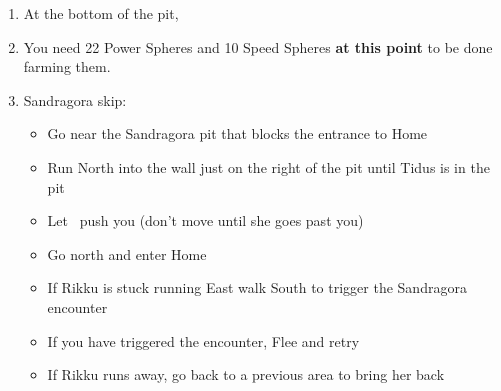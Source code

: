 \begin{enumerate}[resume]
    \item At the bottom of the pit, 
    \item You need 22 Power Spheres and 10 Speed Spheres \textbf{at this point} to be done farming them.
    \blitzballdetermination[true]{%
        \item \formation{\tidus}{\lulu}{\auron}
    }{%
        \item \formation{\tidus}{\rikku}{\auron}
    }
    \item Sandragora skip:
    \begin{itemize}
        \item Go near the Sandragora pit that blocks the entrance to Home
        \item Run North into the wall just on the right of the pit until Tidus is in the pit
        \item Let \rikku\ push you (don't move until she goes past you)
        \item Go north and enter Home
        \item If Rikku is stuck running East walk South to trigger the Sandragora encounter
        \item If you have triggered the encounter, Flee and retry
        \item If Rikku runs away, go back to a previous area to bring her back
    \end{itemize}
\end{enumerate}
\bothcb\winnpsingle\lossnpsingle
